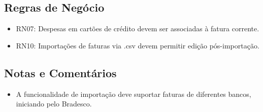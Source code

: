 \subsection*{Regras de Negócio}
\begin{addmargin}[1.5cm]{0cm}
    \begin{itemize}
        \item RN07: Despesas em cartões de crédito devem ser associadas à fatura corrente.
        \item RN10: Importações de faturas via .csv devem permitir edição pós-importação.
    \end{itemize}
\end{addmargin}

\subsection*{Notas e Comentários}
\begin{addmargin}[1.5cm]{0cm}
    \begin{itemize}
        \item A funcionalidade de importação deve suportar faturas de diferentes bancos, iniciando pelo Bradesco.
    \end{itemize}
\end{addmargin}
